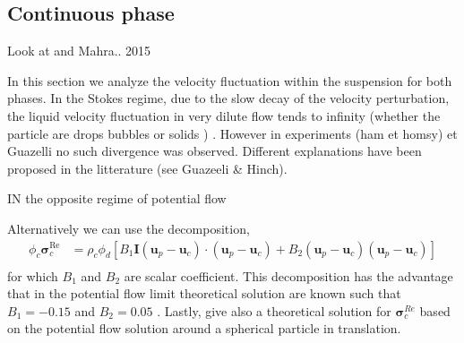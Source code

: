 \subsection{Continuous phase}
Look at \citep{wang2021numerical} and Mahra.. 2015 



In this section we analyze the velocity fluctuation within the suspension for both phases. 
In the Stokes regime, due to the slow decay of the velocity perturbation, the liquid velocity fluctuation in very dilute flow tends to infinity (whether the particle are drops bubbles or solids ) \citep{luke1965}. However in experiments (ham et homsy) et Guazelli no such divergence was observed. Different explanations have been proposed in the litterature (see Guazeeli \& Hinch).

IN the opposite regime of potential flow

Alternatively we can use the decomposition,
\begin{align}
    \phi_c\bm{\sigma}^{\text{Re}}_c &=  \rho_c \phi_d 
    \left[
        B_1\textbf{I}(\textbf{u}_p - \textbf{u}_c)\cdot (\textbf{u}_p - \textbf{u}_c) 
        +B_2 (\textbf{u}_p - \textbf{u}_c) (\textbf{u}_p - \textbf{u}_c) 
    \right]\\
\end{align}
for which $B_1$ and $B_2$ are scalar coefficient. 
This decomposition has the advantage that in the potential flow limit theoretical solution are known such that  $B_1 = -0.15$ and  $B_2 = 0.05$ \citet{zhang1994averaged,wang2021numerical}. 
Lastly, \citet{lance1991turbulence} give also a theoretical solution for $\bm{\sigma}^{Re}_c$ based on the potential flow solution around a spherical particle in translation. 




